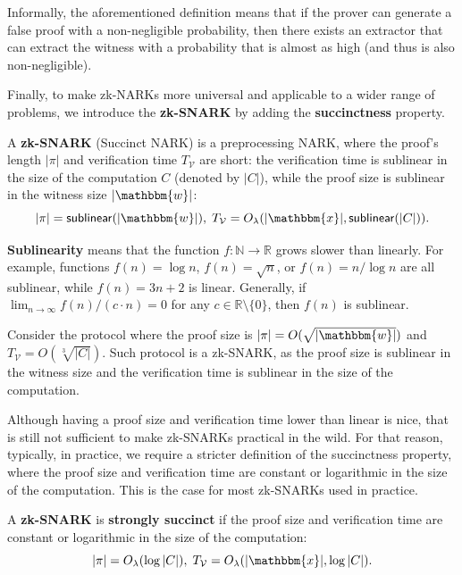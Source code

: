 \documentclass[../../book.tex]{subfiles}
\begin{document}
\begin{remark}
    Informally, the aforementioned definition means that if the prover can
    generate a false proof with a non-negligible probability, then there exists
    an extractor that can extract the witness with a probability that is almost
    as high (and thus is also non-negligible).
\end{remark}

Finally, to make zk-NARKs more universal and applicable to a wider range of
problems, we introduce the \textbf{zk-SNARK} by adding the \textbf{succinctness}
property.

\begin{definition}
    A \textbf{zk-SNARK} (Succinct NARK) is a preprocessing NARK, where the
    proof's length $|\pi|$ and verification time $T_{\mathcal{V}}$ are short:
    the verification time is sublinear in the size of the computation $C$
    (denoted by $|C|$), while the proof size is sublinear in the witness size
    $|\mathbbm{w}|$:
    \begin{equation*}
        |\pi| = \mathsf{sublinear}(|\mathbbm{w}|), \; T_{\mathcal{V}} = O_{\lambda}(|\mathbbm{x}|, \mathsf{sublinear}(|C|)).
    \end{equation*}
\end{definition}

\begin{remark}
    \textbf{Sublinearity} means that the function $f: \mathbb{N} \to \mathbb{R}$
    grows slower than linearly. For example, functions $f(n) = \log n$, $f(n) =
    \sqrt{n}$, or $f(n)=n/\log n$ are all sublinear, while $f(n) = 3n+2$ is
    linear. Generally, if $\lim_{n \to \infty}f(n)/(c \cdot n) = 0$ for any $c
    \in \mathbb{R}\setminus \{0\}$, then $f(n)$ is sublinear.
\end{remark}

\begin{example}
    Consider the protocol where the proof size is $|\pi| = O(\sqrt{|\mathbbm{w}|})$ and
    $T_{\mathcal{V}} = O(\sqrt[3]{|C|})$. Such protocol is a zk-SNARK, as the
    proof size is sublinear in the witness size and the verification time is
    sublinear in the size of the computation.
\end{example}

Although having a proof size and verification time lower than linear is nice,
that is still not sufficient to make zk-SNARKs practical in the wild. For that
reason, typically, in practice, we require a stricter definition of the
succinctness property, where the proof size and verification time are constant
or logarithmic in the size of the computation. This is the case for most
zk-SNARKs used in practice.
\begin{definition}
    A \textbf{zk-SNARK} is \textbf{strongly succinct} if the proof size and
    verification time are constant or logarithmic in the size of the
    computation:
    \begin{equation*}
        |\pi| = O_{\lambda}(\log |C|), \; T_{\mathcal{V}} = O_{\lambda}(|\mathbbm{x}|, \log|C|).
    \end{equation*}
\end{definition}
\end{document}
